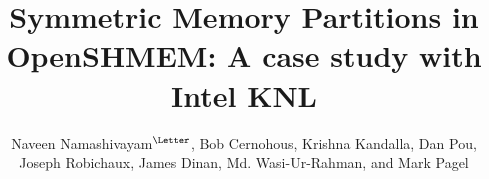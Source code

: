 \documentclass[runningheads,a4paper]{llncs}
\begin{document}
\mainmatter
\title{Symmetric Memory Partitions in OpenSHMEM: A case study with Intel KNL}
\author{Naveen Namashivayam\affmark[1]$^{\textrm{\Letter}}$,
        Bob Cernohous\affmark[1],
        Krishna Kandalla\affmark[1],
        Dan Pou\affmark[1],
        Joseph Robichaux\affmark[2],
        James Dinan\affmark[2],
        Md. Wasi-Ur-Rahman\affmark[2],
        and Mark Pagel\affmark[1]}


\maketitle
\begin{abstract}

\end{abstract}














\end{document}
